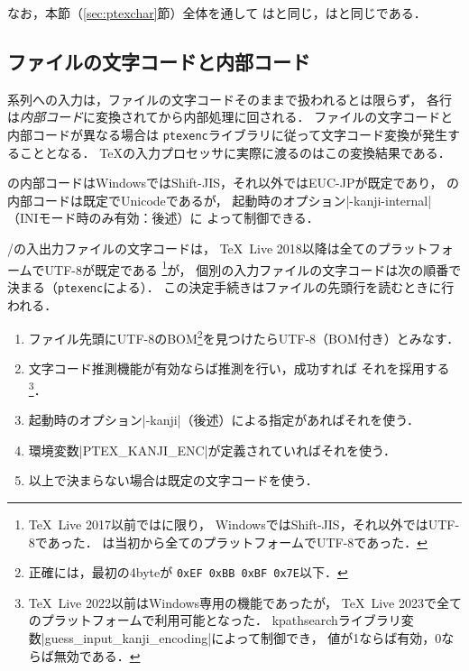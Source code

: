 \documentclass[a4paper,11pt,nomag,dvipdfmx]{jsarticle}
\def\code#1{\texttt{#1}}
\begin{document}
なお，本節（\ref{sec:ptexchar}節）全体を通して
\epTeX は\pTeX と同じ，\eupTeX は\upTeX と同じである．

\subsection{ファイルの文字コードと内部コード}
\pTeX 系列への入力は，ファイルの文字コードそのままで扱われるとは限らず，
各行は\emph{内部コード}に変換されてから内部処理に回される．
ファイルの文字コードと内部コードが異なる場合は
\code{ptexenc}ライブラリに従って文字コード変換が発生することとなる．
\TeX の入力プロセッサに実際に渡るのはこの変換結果である．

\pTeX の内部コードはWindowsではShift-JIS，それ以外ではEUC-JPが既定であり，
\upTeX の内部コードは既定でUnicodeであるが，
起動時のオプション|-kanji-internal|（INIモード時のみ有効：後述）に
よって制御できる．

\pTeX/\upTeX の入出力ファイルの文字コードは，
\TeX~Live 2018以降は全てのプラットフォームでUTF-8が既定である
\footnote{\TeX~Live 2017以前では\pTeX に限り，
WindowsではShift-JIS，それ以外ではUTF-8であった．
\upTeX は当初から全てのプラットフォームでUTF-8であった．}が，
個別の入力ファイルの文字コードは次の順番で決まる（\code{ptexenc}による）．
この決定手続きはファイルの先頭行を読むときに行われる．
\begin{enumerate}
 \item ファイル先頭にUTF-8のBOM\footnote{正確には，最初の4byteが
   \code{0xEF 0xBB 0xBF 0x7E}以下．}を見つけたらUTF-8（BOM付き）とみなす．
 \item 文字コード推測機能が有効ならば推測を行い，成功すれば
   それを採用する\footnote{\TeX~Live 2022以前はWindows専用の機能であったが，
   \TeX~Live 2023で全てのプラットフォームで利用可能となった\cite{tjb142}．
   kpathsearchライブラリ変数|guess_input_kanji_encoding|によって制御でき，
   値が1ならば有効，0ならば無効である．}．
 \item 起動時のオプション|-kanji|（後述）による指定があればそれを使う．
 \item 環境変数|PTEX_KANJI_ENC|が定義されていればそれを使う．
 \item 以上で決まらない場合は既定の文字コードを使う．
\end{enumerate}
\end{document}
